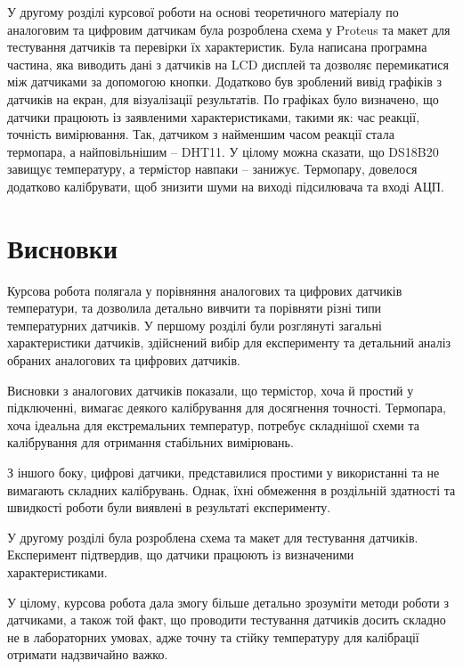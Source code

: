 \documentclass[a4paper,14pt]{extreport}
\begin{document}

У другому розділі курсової роботи на основі теоретичного матеріалу по аналоговим та цифровим датчикам була розроблена схема у Proteus та макет для тестування датчиків та перевірки їх характеристик. Була написана програмна частина, яка виводить дані з датчиків на LCD дисплей та дозволяє перемикатися між датчиками за допомогою кнопки. Додатково був зроблений вивід графіків з датчиків на екран, для візуалізації результатів. По графіках було визначено, що датчики працюють із заявленими характеристиками, такими як: час реакції, точність вимірювання. Так, датчиком з найменшим часом реакції стала термопара, а найповільнішим -- DHT11. У цілому можна сказати, що DS18B20 завищує температуру, а термістор навпаки -- занижує. Термопару, довелося додатково калібрувати, щоб знизити шуми на виході підсилювача та вході АЦП.

\chapter*{Висновки}

Курсова робота полягала у порівняння аналогових та цифрових датчиків температури, та дозволила детально вивчити та порівняти різні типи температурних датчиків. У першому розділі були розглянуті загальні характеристики датчиків, здійснений вибір для експерименту та детальний аналіз обраних аналогових та цифрових датчиків.

Висновки з аналогових датчиків показали, що термістор, хоча й простий у підключенні, вимагає деякого калібрування для досягнення точності. Термопара, хоча ідеальна для екстремальних температур, потребує складнішої схеми та калібрування для отримання стабільних вимірювань. 

З іншого боку, цифрові датчики, представилися простими у використанні та не вимагають складних калібрувань. Однак, їхні обмеження в роздільній здатності та швидкості роботи були виявлені в результаті експерименту.

У другому розділі була розроблена схема та макет для тестування датчиків. Експеримент підтвердив, що датчики працюють із визначеними характеристиками.

У цілому, курсова робота дала змогу більше детально зрозуміти методи роботи з датчиками, а також той факт, що проводити тестування датчиків досить складно не в лабораторних умовах, адже точну та стійку температуру для калібрації отримати надзвичайно важко.

\printbibliography[heading=bibintoc, title=Список використанних джерел]

\begin{appendices}
    


\end{appendices}
\end{document}

